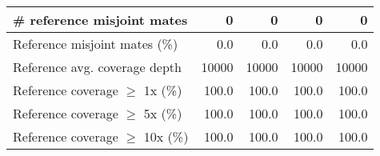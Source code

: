 \documentclass[12pt,a4paper]{article}
\begin{document}
\begin{table}[ht]
\begin{center}
\begin{tabular}{|l*{4}{|r}|}
\# reference misjoint mates & 0 & 0 & 0 & 0 \\ \hline
Reference misjoint mates (\%) & 0.0 & 0.0 & 0.0 & 0.0 \\ \hline
Reference avg. coverage depth & 10000 & 10000 & 10000 & 10000 \\ \hline
Reference coverage $\geq$ 1x (\%) & 100.0 & 100.0 & 100.0 & 100.0 \\ \hline
Reference coverage $\geq$ 5x (\%) & 100.0 & 100.0 & 100.0 & 100.0 \\ \hline
Reference coverage $\geq$ 10x (\%) & 100.0 & 100.0 & 100.0 & 100.0 \\ \hline
\end{tabular}
\end{center}
\end{table}
\end{document}
